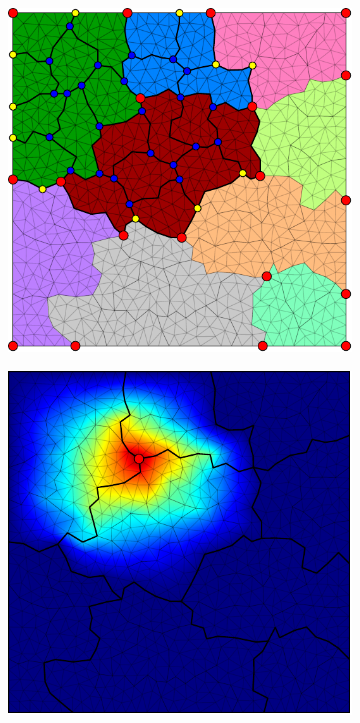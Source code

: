 \begin{figure}[htbp]
\begin{subfigure}[t]{0.3\textwidth}
  \end{subfigure}
  \hfill
  \begin{subfigure}[t]{0.3\textwidth}
    \centerline{\includegraphics[width=0.9\linewidth]{figs/square/square_tria_metis_node_ml_lvl2_grid}}
  \end{subfigure}
  \hfill
  \begin{subfigure}[t]{0.3\textwidth}
    \centerline{\includegraphics[width=0.9\linewidth]{figs/square/square_tria_metis_node_ml_lvl2_basis}}

\end{subfigure}
\end{figure}
